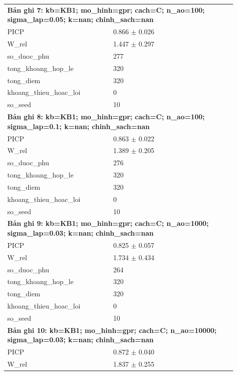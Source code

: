 \begin{longtable}{p{0.43\linewidth}p{0.50\linewidth}}
\multicolumn{2}{p{0.95\linewidth}}{\textbf{Bản ghi 7: kb=KB1; mo\_hinh=gpr; cach=C; n\_ao=100; sigma\_lap=0.05; k=nan; chinh\_sach=nan}} \\
PICP & 0.866 $\pm$ 0.026 \\
W\_\allowbreak rel & 1.447 $\pm$ 0.297 \\
so\_\allowbreak duoc\_\allowbreak phu & 277 \\
tong\_\allowbreak khoang\_\allowbreak hop\_\allowbreak le & 320 \\
tong\_\allowbreak diem & 320 \\
khoang\_\allowbreak thieu\_\allowbreak hoac\_\allowbreak loi & 0 \\
so\_\allowbreak seed & 10 \\
\midrule
\multicolumn{2}{p{0.95\linewidth}}{\textbf{Bản ghi 8: kb=KB1; mo\_hinh=gpr; cach=C; n\_ao=100; sigma\_lap=0.1; k=nan; chinh\_sach=nan}} \\
PICP & 0.863 $\pm$ 0.022 \\
W\_\allowbreak rel & 1.389 $\pm$ 0.205 \\
so\_\allowbreak duoc\_\allowbreak phu & 276 \\
tong\_\allowbreak khoang\_\allowbreak hop\_\allowbreak le & 320 \\
tong\_\allowbreak diem & 320 \\
khoang\_\allowbreak thieu\_\allowbreak hoac\_\allowbreak loi & 0 \\
so\_\allowbreak seed & 10 \\
\midrule
\multicolumn{2}{p{0.95\linewidth}}{\textbf{Bản ghi 9: kb=KB1; mo\_hinh=gpr; cach=C; n\_ao=1000; sigma\_lap=0.03; k=nan; chinh\_sach=nan}} \\
PICP & 0.825 $\pm$ 0.057 \\
W\_\allowbreak rel & 1.734 $\pm$ 0.434 \\
so\_\allowbreak duoc\_\allowbreak phu & 264 \\
tong\_\allowbreak khoang\_\allowbreak hop\_\allowbreak le & 320 \\
tong\_\allowbreak diem & 320 \\
khoang\_\allowbreak thieu\_\allowbreak hoac\_\allowbreak loi & 0 \\
so\_\allowbreak seed & 10 \\
\midrule
\multicolumn{2}{p{0.95\linewidth}}{\textbf{Bản ghi 10: kb=KB1; mo\_hinh=gpr; cach=C; n\_ao=10000; sigma\_lap=0.03; k=nan; chinh\_sach=nan}} \\
PICP & 0.872 $\pm$ 0.040 \\
W\_\allowbreak rel & 1.837 $\pm$ 0.255 \\

\end{longtable}
